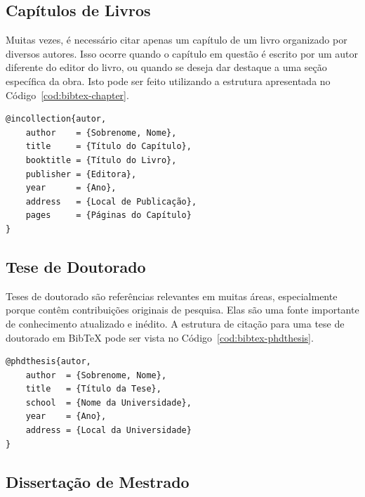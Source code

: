 \subsection{Capítulos de Livros}

Muitas vezes, é necessário citar apenas um capítulo de um livro organizado por diversos autores. Isso ocorre quando o capítulo em questão é escrito por um autor diferente do editor do livro, ou quando se deseja dar destaque a uma seção específica da obra. Isto pode ser feito utilizando a estrutura apresentada no Código~\ref{cod:bibtex-chapter}.

\begin{codigo}[htb]
\begin{lstlisting}
@incollection{autor,
    author    = {Sobrenome, Nome},
    title     = {Título do Capítulo},
    booktitle = {Título do Livro},
    publisher = {Editora},
    year      = {Ano},
    address   = {Local de Publicação},
    pages     = {Páginas do Capítulo}
}
\end{lstlisting}
\fonteautor
\end{codigo}

\subsection{Tese de Doutorado}

Teses de doutorado são referências relevantes em muitas áreas, especialmente porque contêm contribuições originais de pesquisa. Elas são uma fonte importante de conhecimento atualizado e inédito. A estrutura de citação para uma tese de doutorado em BibTeX pode ser vista no Código~\ref{cod:bibtex-phdthesis}.

\begin{codigo}[htb]
\begin{lstlisting}
@phdthesis{autor,
    author  = {Sobrenome, Nome},
    title   = {Título da Tese},
    school  = {Nome da Universidade},
    year    = {Ano},
    address = {Local da Universidade}
}
\end{lstlisting}
\fonteautor
\end{codigo}

\subsection{Dissertação de Mestrado}


